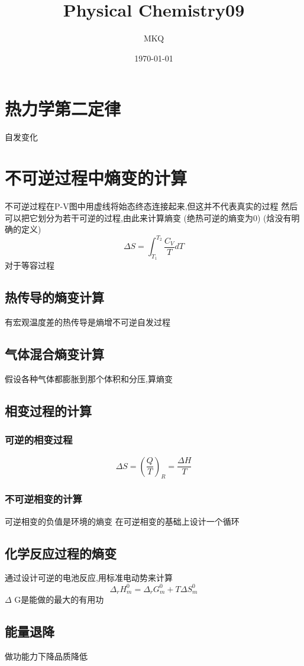 \documentclass[11pt]{article}
\author{MKQ}
\date{\today}
\title{Physical Chemistry09}
\begin{document}
\maketitle
\tableofcontents

\section{热力学第二定律}
\label{sec:org73e5340}
自发变化
\section{不可逆过程中熵变的计算}
\label{sec:org9ee5a5a}
不可逆过程在P-V图中用虚线将始态终态连接起来,但这并不代表真实的过程
然后可以把它划分为若干可逆的过程,由此来计算熵变
(绝热可逆的熵变为0)
(焓没有明确的定义)
\[
\Delta S=\int_{T_1}^{T_2} \frac{C_V}{T} dT
\]
对于等容过程
\subsection{热传导的熵变计算}
\label{sec:org9cd3613}
有宏观温度差的热传导是熵增不可逆自发过程
\subsection{气体混合熵变计算}
\label{sec:orgad4b039}
假设各种气体都膨胀到那个体积和分压,算熵变
\subsection{相变过程的计算}
\label{sec:org1073c14}
\subsubsection{可逆的相变过程}
\label{sec:orgaefb0c4}
\[
\Delta S=(\frac{Q}{T})_R =\frac{\Delta H}{T}
\]
\subsubsection{不可逆相变的计算}
\label{sec:org6d08e88}
可逆相变的负值是环境的熵变
在可逆相变的基础上设计一个循环
\subsection{化学反应过程的熵变}
\label{sec:org13e1a15}
通过设计可逆的电池反应,用标准电动势来计算
\[
\Delta_r H_m^0 =\Delta_r G_m^0 + T\Delta S_m^0
\]
\(\Delta\) G是能做的最大的有用功
\subsection{能量退降}
\label{sec:orgbd21f8c}
做功能力下降品质降低
\end{document}
